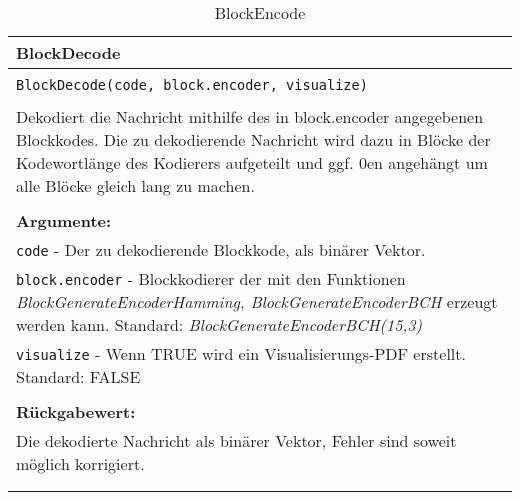 \begin{longtable}{|p{\textwidth}|}
\hline
\rowcolor{lightblue}BlockDecode\\
\hline
\\
\texttt{BlockDecode(code, block.encoder, visualize)}\\
\\
Dekodiert die Nachricht mithilfe des in block.encoder angegebenen Blockkodes. Die zu dekodierende Nachricht wird dazu in Blöcke der Kodewortlänge des Kodierers aufgeteilt und ggf. 0en angehängt um alle Blöcke gleich lang zu machen. \\
\\
\textbf{Argumente:}\\
\texttt{code} - Der zu dekodierende Blockkode, als binärer Vektor.\\
\texttt{block.encoder} - Blockkodierer der mit den Funktionen \emph{BlockGenerateEncoderHamming, BlockGenerateEncoderBCH} erzeugt werden kann. Standard: \emph{BlockGenerateEncoderBCH(15,3)}\\
\texttt{visualize} - Wenn TRUE wird ein Visualisierungs-PDF erstellt. Standard: FALSE\\
\\
\textbf{Rückgabewert:}\\
Die dekodierte Nachricht als binärer Vektor, Fehler sind soweit möglich korrigiert.\\
\\
\hline
\caption{BlockEncode}
\end{longtable}